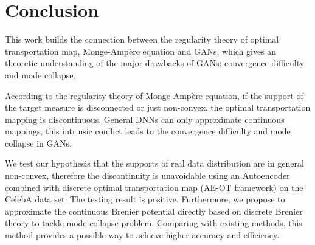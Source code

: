 \documentclass{article}
\begin{document}
\section{Conclusion}
\label{sec:conclusion}

This work builds the connection between the regularity theory of optimal transportation map, Monge-Amp\`{e}re equation and GANs, which gives an theoretic understanding of the major drawbacks of GANs: convergence difficulty and mode collapse.
 
According to the regularity theory of Monge-Amp\`{e}re equation, if the support of the target measure is disconnected or just non-convex, the optimal transportation mapping is discontinuous. General DNNs can only approximate continuous mappings, this intrinsic conflict leads to the convergence difficulty and mode collapse in GANs.

We test our hypothesis that the supports of real data distribution are in general non-convex, therefore the discontinuity is unavoidable using an Autoencoder combined with discrete optimal transportation map (AE-OT framework) on the CelebA data set. The testing result is positive. Furthermore, we propose to approximate the continuous Brenier potential directly based on discrete Brenier theory to tackle mode collapse problem. Comparing with existing methods, this method provides a possible way to achieve higher accuracy and efficiency.






\pagebreak
\appendix
\end{document}
